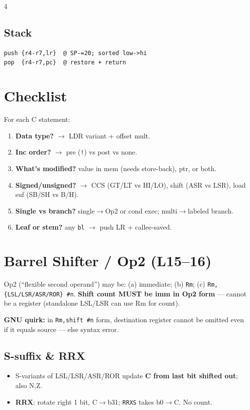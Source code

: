 \documentclass[8pt,landscape]{extarticle}
\newcommand{\asm}[1]{\texttt{\scriptsize #1}}
\begin{document}
\begin{multicols*}{4}
\subsection{Stack}
\begin{lstlisting}
push {r4-r7,lr}  @ SP-=20; sorted low->hi
pop  {r4-r7,pc}  @ restore + return
\end{lstlisting}

\section{Checklist}
For each C statement:
\begin{enumerate}
\item \textbf{Data type?} $\to$ LDR variant + offset mult.
\item \textbf{Inc order?} $\to$ pre (\texttt{!}) vs post vs none.
\item \textbf{What's modified?} value in mem (needs store-back), ptr, or both.
\item \textbf{Signed/unsigned?} $\to$ CCS (GT/LT vs HI/LO), shift (ASR vs LSR), load suf (SB/SH vs B/H).
\item \textbf{Single vs branch?} single$\to$Op2 or cond exec; multi$\to$labeled branch.
\item \textbf{Leaf or stem?} any \asm{bl} $\to$ push LR + callee-saved.
\end{enumerate}

\section{Barrel Shifter / Op2 (L15--16)}
Op2 (``flexible second operand'') may be: (a) immediate; (b) \texttt{Rm}; (c) \texttt{Rm,\{LSL/LSR/ASR/ROR\} \#n}. \textbf{Shift count MUST be imm in Op2 form} --- cannot be a register (standalone LSL/LSR can use Rm for count).

\textbf{GNU quirk:} in \asm{Rm,shift \#n} form, destination register cannot be omitted even if it equals source --- else syntax error.

\subsection{S-suffix \& RRX}
\begin{itemize}
\item S-variants of LSL/LSR/ASR/ROR update \textbf{C from last bit shifted out}; also N,Z.
\item \textbf{RRX}: rotate right 1 bit, C$\to$b31; \asm{RRXS} takes b0$\to$C. No count.
\end{itemize}


\end{multicols*}
\end{document}
